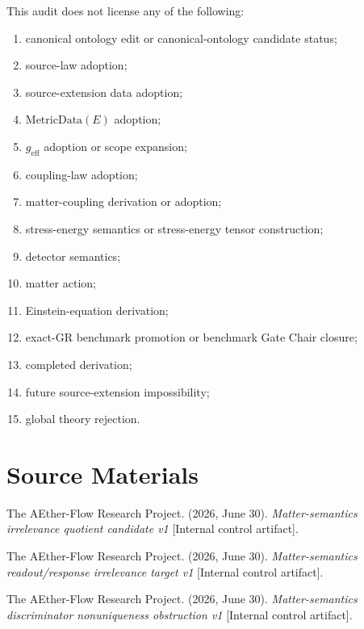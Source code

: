 This audit does not license any of the following:
\begin{enumerate}
  \item canonical ontology edit or canonical-ontology candidate status;
  \item source-law adoption;
  \item source-extension data adoption;
  \item \(\mathrm{MetricData}(E)\) adoption;
  \item \(g_{\mathrm{eff}}\) adoption or scope expansion;
  \item coupling-law adoption;
  \item matter-coupling derivation or adoption;
  \item stress-energy semantics or stress-energy tensor construction;
  \item detector semantics;
  \item matter action;
  \item Einstein-equation derivation;
  \item exact-GR benchmark promotion or benchmark Gate Chair closure;
  \item completed derivation;
  \item future source-extension impossibility;
  \item global theory rejection.
\end{enumerate}

\section{Source Materials}

The AEther-Flow Research Project. (2026, June 30). \emph{Matter-semantics
irrelevance quotient candidate v1} [Internal control artifact].

The AEther-Flow Research Project. (2026, June 30). \emph{Matter-semantics
readout/response irrelevance target v1} [Internal control artifact].

The AEther-Flow Research Project. (2026, June 30). \emph{Matter-semantics
discriminator nonuniqueness obstruction v1} [Internal control artifact].
